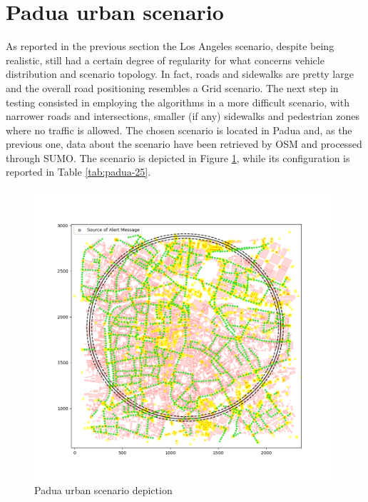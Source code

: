 	\section{Padua urban scenario}
		\label{sec:padua-urban}
		As reported in the previous section the Los Angeles scenario, despite being realistic, still had a certain degree of regularity for what concerns vehicle distribution and scenario topology. In fact, roads and sidewalks are pretty large and the overall road positioning resembles a Grid scenario. The next step in testing consisted in employing the algorithms in a more difficult scenario, with narrower roads and intersections, smaller (if any) sidewalks and pedestrian zones where no traffic is allowed. The chosen scenario is located in Padua and, as the previous one, data about the scenario have been retrieved by OSM and processed through SUMO. The scenario is depicted in Figure \ref{fig:padua-scenario}, while its configuration is reported in Table \ref{tab:padua-25}. 
		
		\begin{figure}[H]
			\centering
			\includegraphics[width=0.98\textwidth]{immagini/padua-25/padua-scenario}
			\caption{Padua urban scenario depiction}
			\label{fig:padua-scenario}
		\end{figure}
	
